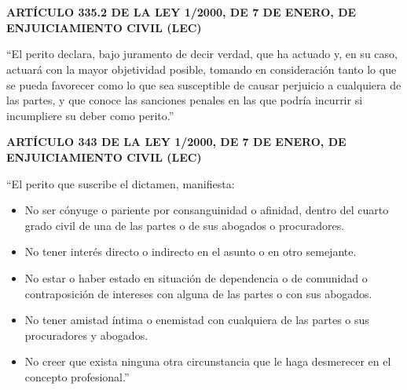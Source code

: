 \section*{}
\begin{center}
    \textbf{\noindent ARTÍCULO 335.2 DE LA LEY 1/2000, DE 7 DE ENERO, DE ENJUICIAMIENTO CIVIL (LEC)}
\end{center}

``El perito declara, bajo juramento de decir verdad, que ha actuado y, en su caso, actuará con la mayor objetividad posible, tomando en consideración tanto lo que se pueda favorecer como lo que sea susceptible de causar perjuicio a cualquiera de las partes, y que conoce las sanciones penales en las que podría incurrir si incumpliere su deber como perito.''
\vspace{0.2\textheight}
\begin{center}
    \textbf{\noindent ARTÍCULO 343 DE LA LEY 1/2000, DE 7 DE ENERO, DE ENJUICIAMIENTO CIVIL (LEC)}
\end{center}

``El perito que suscribe el dictamen, manifiesta:
\begin{itemize}
    \item No ser cónyuge o pariente por consanguinidad o afinidad, dentro del cuarto grado civil de una de las partes o de sus abogados o procuradores.
    \item No tener interés directo o indirecto en el asunto o en otro semejante.
    \item No estar o haber estado en situación de dependencia o de comunidad o contraposición de intereses con alguna de las partes o con sus abogados.
    \item No tener amistad íntima o enemistad con cualquiera de las partes o sus procuradores y abogados.
    \item No creer que exista ninguna otra circunstancia que le haga desmerecer en el concepto profesional.''
\end{itemize}

\newpage
